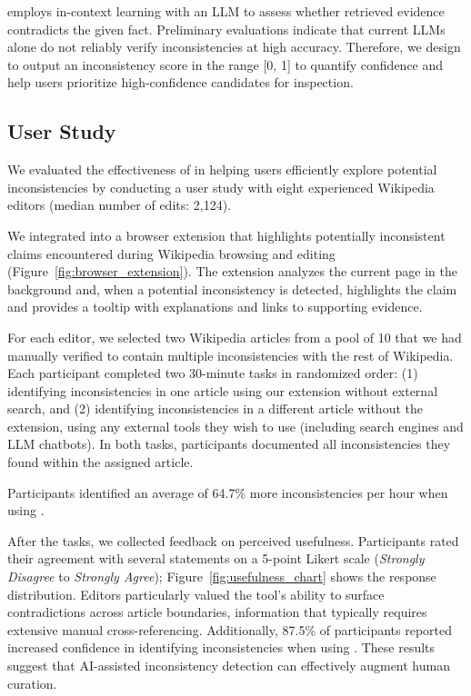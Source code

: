 \system employs in-context learning with an LLM to assess whether retrieved evidence contradicts the given fact. Preliminary evaluations indicate that current LLMs alone do not reliably verify inconsistencies at high accuracy. Therefore, we design \system to output an inconsistency score in the range [0, 1] to quantify confidence and help users prioritize high-confidence candidates for inspection.

\subsection{User Study}
We evaluated the effectiveness of \system in helping users efficiently explore potential inconsistencies by conducting a user study with eight experienced Wikipedia editors (median number of edits: 2{,}124).

We integrated \system into a browser extension that highlights potentially inconsistent claims encountered during Wikipedia browsing and editing (Figure~\ref{fig:browser_extension}). The extension analyzes the current page in the background and, when a potential inconsistency is detected, highlights the claim and provides a tooltip with explanations and links to supporting evidence.

For each editor, we selected two Wikipedia articles from a pool of 10 that we had manually verified to contain multiple inconsistencies with the rest of Wikipedia. Each participant completed two 30-minute tasks in randomized order: (1) identifying inconsistencies in one article using our extension without external search, and (2) identifying inconsistencies in a different article without the extension, using any external tools they wish to use (including search engines and LLM chatbots). In both tasks, participants documented all inconsistencies they found within the assigned article.

Participants identified an average of 64.7\% more inconsistencies per hour when using \system.

After the tasks, we collected feedback on perceived usefulness. Participants rated their agreement with several statements on a 5-point Likert scale (\textit{Strongly Disagree} to \textit{Strongly Agree}); Figure~\ref{fig:usefulness_chart} shows the response distribution. Editors particularly valued the tool's ability to surface contradictions across article boundaries, information that typically requires extensive manual cross-referencing. Additionally, 87.5\% of participants reported increased confidence in identifying inconsistencies when using \system. These results suggest that AI-assisted inconsistency detection can effectively augment human curation.

